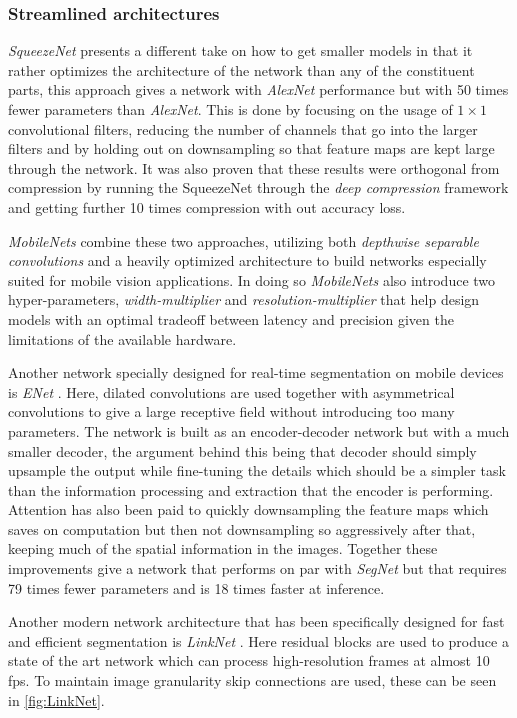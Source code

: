 \documentclass{kththesis}
\newcommand{\bibentry}[1]{\parencite{#1}}
\begin{document}
\subsubsection{Streamlined architectures}
\emph{SqueezeNet} \bibentry{iandola2016squeezenet} presents a different take on
how to get smaller models in that it rather optimizes the architecture of the
network than any of the constituent parts, this approach gives a network with
\emph{AlexNet} performance but with 50 times fewer parameters than 
\emph{AlexNet}. This is done by focusing on the usage of \(1 \times 1\)
convolutional filters, reducing the number of channels that go into the larger
filters and by holding out on downsampling so that feature maps are kept large
through the network. It was also proven that these results were orthogonal from
compression by running the SqueezeNet through the \emph{deep compression}
framework \bibentry{han2015deep} and getting further 10 times compression with
out accuracy loss. 

\emph{MobileNets} \bibentry{howard2017mobilenets} combine these two approaches,
utilizing both \emph{depthwise separable convolutions} and a heavily optimized
architecture to build networks especially suited for mobile vision applications.
In doing so \emph{MobileNets} also introduce two hyper-parameters,
\emph{width-multiplier} and \emph{resolution-multiplier} that help design models
with an optimal tradeoff between latency and precision given the limitations of
the available hardware. 

Another network specially designed for real-time segmentation on mobile devices
is \emph{ENet} \bibentry{paszke2016enet}. Here, dilated convolutions are used
together with asymmetrical convolutions to give a large receptive field without
introducing too many parameters. The network is built as an encoder-decoder
network but with a much smaller decoder, the argument behind this being that
decoder should simply upsample the output while fine-tuning the details which
should be a simpler task than the information processing and extraction that the
encoder is performing. Attention has also been paid to quickly downsampling the
feature maps which saves on computation but then not downsampling so
aggressively after that, keeping much of the spatial information in the images.
Together these improvements give a network that performs on par with
\emph{SegNet} but that requires 79 times fewer parameters and is 18 times faster
at inference. 

Another modern network architecture that has been specifically designed for fast and
efficient segmentation is \textit{LinkNet}
\parencite{chaurasia2017linknet}. Here residual blocks \parencite{residual} are used to produce a
state of the art network which can process high-resolution frames at almost 10
fps. To maintain image granularity skip connections are used, these can be seen
in \cref{fig:LinkNet}.
\end{document}

